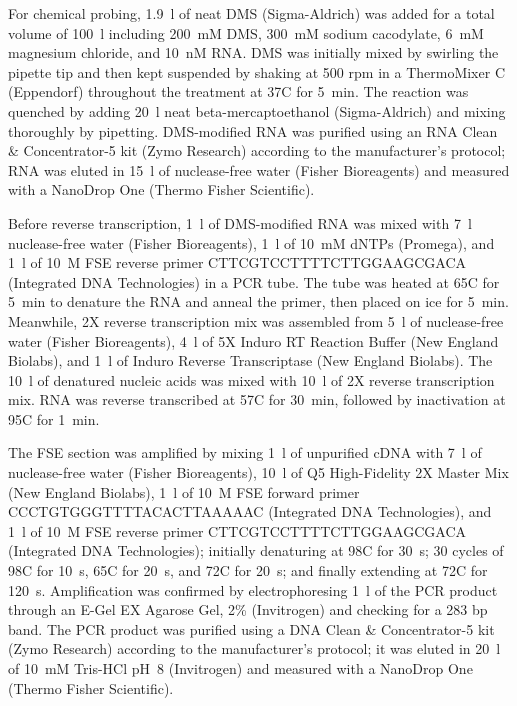 \documentclass[main.tex]{subfiles}
\begin{document}
For chemical probing, 1.9~\textmu l of neat DMS (Sigma-Aldrich) was added for a total volume of 100~\textmu l including 200~mM DMS, 300~mM sodium cacodylate, 6~mM magnesium chloride, and 10~nM RNA.
DMS was initially mixed by swirling the pipette tip and then kept suspended by shaking at 500 rpm in a ThermoMixer C (Eppendorf) throughout the treatment at 37\textdegree C for 5~min.
The reaction was quenched by adding 20~\textmu l neat beta-mercaptoethanol (Sigma-Aldrich) and mixing thoroughly by pipetting.
DMS-modified RNA was purified using an RNA Clean \& Concentrator-5 kit (Zymo Research) according to the manufacturer's protocol; RNA was eluted in 15~\textmu l of nuclease-free water (Fisher Bioreagents) and measured with a NanoDrop One (Thermo Fisher Scientific).

Before reverse transcription, 1~\textmu l of DMS-modified RNA was mixed with 7~\textmu l nuclease-free water (Fisher Bioreagents), 1~\textmu l of 10~mM dNTPs (Promega), and 1~\textmu l of 10~\textmu M FSE reverse primer CTTCGTCCTTTTCTTGGAAGCGACA (Integrated DNA Technologies) in a PCR tube.
The tube was heated at 65\textdegree C for 5~min to denature the RNA and anneal the primer, then placed on ice for 5~min.
Meanwhile, 2X reverse transcription mix was assembled from 5~\textmu l of nuclease-free water (Fisher Bioreagents), 4~\textmu l of 5X Induro RT Reaction Buffer (New England Biolabs), and 1~\textmu l of Induro Reverse Transcriptase (New England Biolabs).
The 10~\textmu l of denatured nucleic acids was mixed with 10~\textmu l of 2X reverse transcription mix.
RNA was reverse transcribed at 57\textdegree C for 30~min, followed by inactivation at 95\textdegree C for 1~min.

The FSE section was amplified by mixing 1~\textmu l of unpurified cDNA with 7~\textmu l of nuclease-free water (Fisher Bioreagents), 10~\textmu l of Q5 High-Fidelity 2X Master Mix (New England Biolabs), 1~\textmu l of 10~\textmu M FSE forward primer CCCTGTGGGTTTTACACTTAAAAAC (Integrated DNA Technologies), and 1~\textmu l of 10~\textmu M FSE reverse primer CTTCGTCCTTTTCTTGGAAGCGACA (Integrated DNA Technologies); initially denaturing at 98\textdegree C for 30~s; 30 cycles of 98\textdegree C for 10~s, 65\textdegree C for 20~s, and 72\textdegree C for 20~s; and finally extending at 72\textdegree C for 120~s.
Amplification was confirmed by electrophoresing 1~\textmu l of the PCR product through an E-Gel EX Agarose Gel, 2\% (Invitrogen) and checking for a 283 bp band.
The PCR product was purified using a DNA Clean \& Concentrator-5 kit (Zymo Research) according to the manufacturer's protocol; it was eluted in 20~\textmu l of 10~mM Tris-HCl pH~8 (Invitrogen) and measured with a NanoDrop One (Thermo Fisher Scientific).
\end{document}
